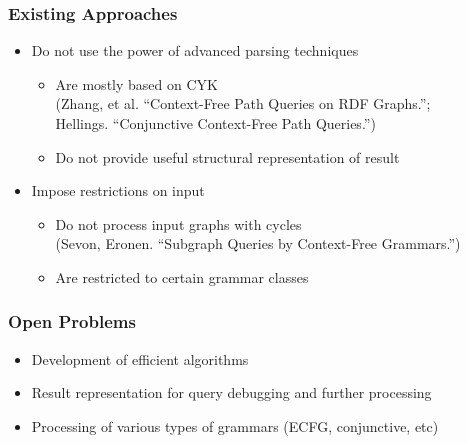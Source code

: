 \documentclass[xcolor=table]{beamer}
\begin{document}
\begin{frame}
  \transwipe[direction=90]
  \frametitle{Existing Approaches}
  \begin{itemize}
    \item Do not use the power of advanced parsing techniques
    \begin{itemize}
       \item Are mostly based on CYK \\ (Zhang, et al. ``Context-Free Path Queries on RDF Graphs.''; \\ Hellings. ``Conjunctive Context-Free Path Queries.'')
       \item Do not provide useful structural representation of result
     \end{itemize}
    \item Impose restrictions on input
    \begin{itemize}
       \item Do not process input graphs with cycles \\ (Sevon, Eronen. ``Subgraph Queries by Context-Free Grammars.'')
       \item Are restricted to certain grammar classes
     \end{itemize}
  \end{itemize}
\end{frame}

\begin{frame}
  \transwipe[direction=90]
  \frametitle{Open Problems}
  \begin{itemize}
    \item Development of efficient algorithms
    \item Result representation for query debugging and further processing 
    \item Processing of various types of grammars (ECFG, conjunctive, etc)
  \end{itemize}
\end{frame}

\end{document}
